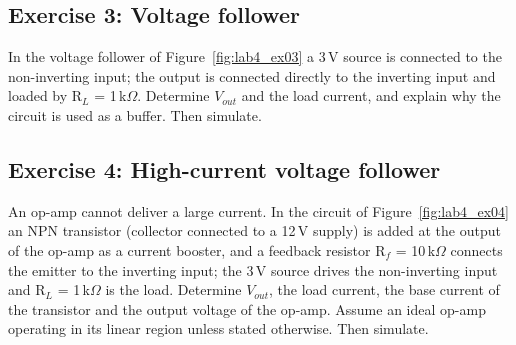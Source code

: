

\subsection{Exercise 3: Voltage follower}
In the voltage follower of Figure~\ref{fig:lab4_ex03} a 3\,V source is connected to the non-inverting input; the output is connected directly to the inverting input and loaded by R$_L$ = 1\,k$\Omega$. Determine $V_{out}$ and the load current, and explain why the circuit is used as a buffer. Then simulate.






\subsection{Exercise 4: High-current voltage follower}
An op-amp cannot deliver a large current. In the circuit of Figure~\ref{fig:lab4_ex04} an NPN transistor (collector connected to a 12\,V supply) is added at the output of the op-amp as a current booster, and a feedback resistor R$_f$ = 10\,k$\Omega$ connects the emitter to the inverting input; the 3\,V source drives the non-inverting input and R$_L$ = 1\,k$\Omega$ is the load. Determine $V_{out}$, the load current, the base current of the transistor and the output voltage of the op-amp. Assume an ideal op-amp operating in its linear region unless stated otherwise. Then simulate.

